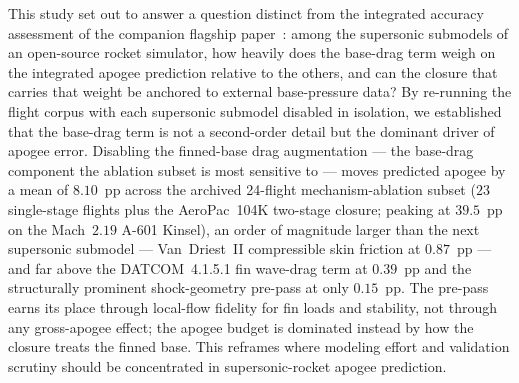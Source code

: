 This study set out to answer a question distinct from the integrated accuracy
assessment of the companion flagship paper~\cite{yu2026jsr}: among the supersonic
submodels of an open-source rocket simulator, how heavily does the base-drag term
weigh on the integrated apogee prediction relative to the others, and can the
closure that carries that weight be anchored to external base-pressure data? By
re-running the flight corpus with each supersonic submodel disabled in isolation,
we established that the base-drag term is not a second-order detail but the
dominant driver of apogee error. Disabling the finned-base drag augmentation ---
the base-drag component the ablation subset is most sensitive to --- moves predicted apogee
by a mean of $8.10$~pp across the archived 24-flight mechanism-ablation subset
($23$ single-stage flights plus the AeroPac~104K two-stage closure; peaking at $39.5$~pp on
the Mach~$2.19$ A-601 Kinsel), an order of magnitude larger than the next
supersonic submodel --- Van~Driest~II compressible skin friction at $0.87$~pp
\cite{hopkins1971} --- and far above the DATCOM~4.1.5.1 fin wave-drag term at
$0.39$~pp and the structurally prominent shock-geometry pre-pass at only
$0.15$~pp. The pre-pass
earns its place through local-flow fidelity for fin loads and stability, not
through any gross-apogee effect; the apogee budget is dominated instead by how
the closure treats the finned base. This reframes where modeling effort and
validation scrutiny should be concentrated in supersonic-rocket apogee
prediction.

